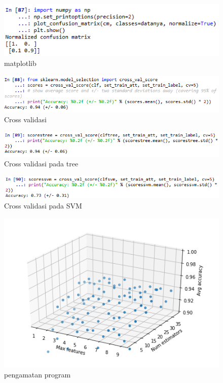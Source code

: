 \begin{figure}[!htbp]
	\centering
	\includegraphics[width=1\textwidth]{figures/fathi/chapter4/hari2/5}
	\caption{matplotlib}
	\label{fig5}
\end{figure}
\begin{figure}[!htbp]
	\centering
	\includegraphics[width=1\textwidth]{figures/fathi/chapter4/hari2/6}
	\caption{Cross validasi}
	\label{fig6}
\end{figure}
\begin{figure}[!htbp]
	\centering
	\includegraphics[width=1\textwidth]{figures/fathi/chapter4/hari2/7}
	\caption{Cross validasi pada tree}
	\label{fig7}
\end{figure}
\begin{figure}[!htbp]
	\centering
	\includegraphics[width=1\textwidth]{figures/fathi/chapter4/hari2/8}
	\caption{Cross validasi pada SVM}
	\label{fig8}
\end{figure}
\begin{figure}[!htbp]
	\centering
	\includegraphics[width=1\textwidth]{figures/fathi/chapter4/hari2/9}
	\caption{pengamatan program}
	\label{fig9}
\end{figure}
